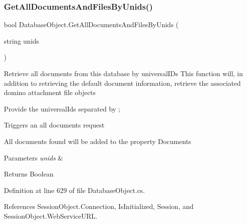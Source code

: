 \subsubsection{\texorpdfstring{Get\+All\+Documents\+And\+Files\+By\+Unids()}{GetAllDocumentsAndFilesByUnids()}\hspace{0.1cm}{\footnotesize\ttfamily [1/2]}}
{\footnotesize\ttfamily bool Database\+Object.\+Get\+All\+Documents\+And\+Files\+By\+Unids (\begin{DoxyParamCaption}\item[{string}]{unids }\end{DoxyParamCaption})}



Retrieve all documents from this database by universal\+I\+Ds This function will, in addition to retrieving the default document information, retrieve the associated domino attachment file objects 

Provide the universal\+Ids separated by ;

Triggers an all documents request

All documents found will be added to the property \textquotesingle{}Documents\textquotesingle{}


\begin{DoxyParams}{Parameters}
{\em unids} & \\
\hline
\end{DoxyParams}
\begin{DoxyReturn}{Returns}
Boolean
\end{DoxyReturn}


Definition at line 629 of file Database\+Object.\+cs.



References Session\+Object.\+Connection, Is\+Initialized, Session, and Session\+Object.\+Web\+Service\+U\+RL.


